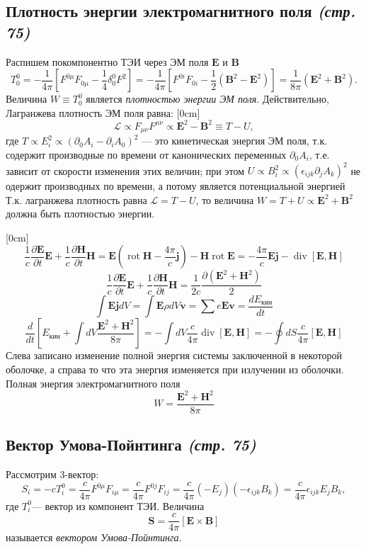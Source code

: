 \documentclass[a4paper,12pt]{article}
\begin{document}
\subsection{Плотность энергии электромагнитного поля \emph{(стр. 75)}}
Распишем покомпонентно ТЭИ через ЭМ поля  $\mathbf{E}$ и
$\mathbf{B}$
\[
T_0^0=-\frac{1}{4\pi}\left[ F^{0\mu}F_{0\mu}-\frac{1}{4}\delta_0^0 F^2 \right]=
-\frac{1}{4\pi}\left[ F^{0i}F_{0i}-\frac{1}{2}\left( \mathbf{B}^2-\mathbf{E}^2
\right) \right] =\frac{1}{8\pi}\left( \mathbf{E}^2+\mathbf{B}^2 \right) 
.\] 
Величина $W\equiv T_0^0$ является  \emph{плотностью энергии ЭМ поля}.
Действительно, Лагранжева плотность ЭМ поля равна:
[0cm]
\[
\mathcal{L}\propto F_{\mu\nu}F^{\mu\nu}\propto\mathbf{E}^2-\mathbf{B}^2\equiv
T-U
,\]
где $T \propto E_i^2\propto\left(\partial_0A_i-\partial_iA_0\right)^2$ ---
это кинетическая энергия ЭМ поля,  т.\:к. содержит производные по времени
от канонических переменных $\partial_0 A_i$,  т.\:е. зависит от скорости
изменения этих величин; при этом $U \propto B_i^2 \propto \left( 
\epsilon_{ijk}\partial_j A_k\right) ^2$ не  одержит производных по времени, а
потому является потенциальной энергией
Т.\:к. лагранжева плотность равна $\mathcal{L}=T-U$, то величина $W=T+U\propto
\mathbf{E}^2+\mathbf{B}^2$ должна быть плотностью энергии. 

[0cm]
\[
\frac{1}{c}\frac{\partial \mathbf{E}}{\partial t}\mathbf{E}+\frac{1}{c}\frac{\partial \mathbf{H}}{\partial t}\mathbf{H}=\mathbf{E}\left(\operatorname{rot}\mathbf{H}-\frac{4\pi}{c}\mathbf{j}\right)-\mathbf{H}\operatorname{rot}\mathbf{E}=-\frac{4\pi}{c}\mathbf{E}\mathbf{j}-\operatorname{div}{[\mathbf{E},\mathbf{H}]}
\]
\[
\frac{1}{c}\frac{\partial \mathbf{E}}{\partial t}\mathbf{E}+\frac{1}{c}\frac{\partial \mathbf{H}}{\partial t}\mathbf{H}=\frac{1}{2c}\frac{\partial (\mathbf{E}^2+\mathbf{H}^2)}{2}
\]
\[\int \mathbf{E}\mathbf{j} dV=\int \mathbf{E}\rho dV \mathbf{v}=\sum e\mathbf{E}\mathbf{v}=\frac{dE_{\text{кин}}}{dt}\]
\[\frac{d}{dt}\left[E_{\text{кин}}+\int dV\frac{\mathbf{E}^2+\mathbf{H}^2}{8\pi}\right]=-\int dV\frac{c}{4\pi}\operatorname{div}{[\mathbf{E},\mathbf{H}]}=-\oint dS \frac{c}{4\pi}[\mathbf{E},\mathbf{H}]\]
Слева записано изменение полной энергия системы заключенной в некоторой оболочке, а справа то что эта энергия изменяется при излучении из оболочки. Полная энергия электромагнитного поля 
\[W=\frac{\mathbf{E}^2+\mathbf{H}^2}{8\pi}\]
\subsection{Вектор Умова-Пойнтинга \emph{(стр. 75)}}
Рассмотрим 3-вектор:
\[
S_i=-cT_i^0=\frac{c}{4\pi}F^{0\mu}F_{i\mu}=\frac{c}{4\pi}F^{0j}F_{ij}=
\frac{c}{4\pi}(-E_j)(-\epsilon_{ijk}B_k)=\frac{c}{4\pi}\epsilon_{ijk}E_j B_k
,\]
где $T_i^{0}$--- вектор из компонент ТЭИ.
Величина
\[
\mathbf{S}=\frac{c}{4\pi}\left[ \mathbf{E}\times\mathbf{B} \right] 
\]
называется \emph{вектором Умова-Пойнтинга}.
\end{document}

